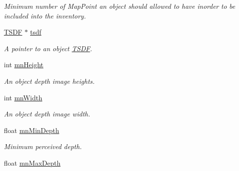\begin{DoxyCompactItemize}
\begin{DoxyCompactList}\small\item\em Minimum number of Map\+Point an object should allowed to have inorder to be included into the inventory. \end{DoxyCompactList}\item 
\hyperlink{classTSDF}{T\+S\+DF} $\ast$ \hyperlink{classMapObject_a0bdf378b69faa47bdae21cb1c4d8a10f}{tsdf}\hypertarget{classMapObject_a0bdf378b69faa47bdae21cb1c4d8a10f}{}\label{classMapObject_a0bdf378b69faa47bdae21cb1c4d8a10f}

\begin{DoxyCompactList}\small\item\em A pointer to an object \hyperlink{classTSDF}{T\+S\+DF}. \end{DoxyCompactList}\item 
int \hyperlink{classMapObject_aae07ca75ae5d8ada1ec52831840f92b5}{mn\+Height}\hypertarget{classMapObject_aae07ca75ae5d8ada1ec52831840f92b5}{}\label{classMapObject_aae07ca75ae5d8ada1ec52831840f92b5}

\begin{DoxyCompactList}\small\item\em An object depth image heights. \end{DoxyCompactList}\item 
int \hyperlink{classMapObject_ab750f036f54a4301932d144cdc2f2abe}{mn\+Width}\hypertarget{classMapObject_ab750f036f54a4301932d144cdc2f2abe}{}\label{classMapObject_ab750f036f54a4301932d144cdc2f2abe}

\begin{DoxyCompactList}\small\item\em An object depth image width. \end{DoxyCompactList}\item 
float \hyperlink{classMapObject_ad664bea1bfcd96947a4d9e066541761a}{mn\+Min\+Depth}\hypertarget{classMapObject_ad664bea1bfcd96947a4d9e066541761a}{}\label{classMapObject_ad664bea1bfcd96947a4d9e066541761a}

\begin{DoxyCompactList}\small\item\em Minimum perceived depth. \end{DoxyCompactList}\item 
float \hyperlink{classMapObject_a5d653f6c84465d0fb0922350829ce880}{mn\+Max\+Depth}\hypertarget{classMapObject_a5d653f6c84465d0fb0922350829ce880}{}\label{classMapObject_a5d653f6c84465d0fb0922350829ce880}


\end{DoxyCompactItemize}
